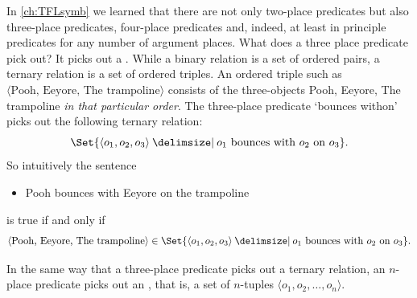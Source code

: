In \cref{ch:TFLsymb} we learned that there are not only two-place predicates but also three-place predicates, four-place predicates and, indeed, at least in principle predicates for any number of argument places. What does a three place predicate pick out? It picks out a . While a binary relation is a set of ordered pairs, a ternary relation is a set of ordered triples. An ordered triple such as $\langle\text{Pooh, Eeyore, The trampoline}\rangle$ consists of the three-objects Pooh, Eeyore, The trampoline \emph{in that particular order}. The three-place predicate `bounces withon' picks out the following ternary relation:
$$\Set{\langle o_1,o_2,o_3\rangle \given o_1\text{ bounces with }o_2\text{ on }o_3}.$$
So intuitively the sentence 
\begin{itemize}
	\item Pooh bounces with Eeyore on the trampoline
\end{itemize}
is true if and only if
$$\langle\text{Pooh, Eeyore, The trampoline}\rangle\in\Set{\langle o_1,o_2,o_3\rangle \given o_1\text{ bounces with }o_2\text{ on }o_3}.$$

In the same way that a three-place predicate picks out a ternary relation, an $n$-place predicate picks out an , that is, a set of $n$-tuples $\langle o_1,o_2,\ldots,o_n\rangle$.


%

